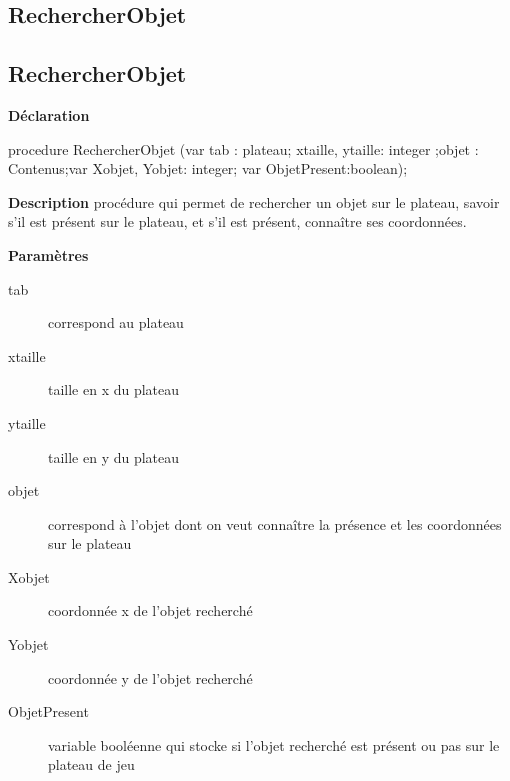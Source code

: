 \documentclass{report}
\newif\ifpdf
\begin{document}
\subsection*{\large{\textbf{RechercherObjet}}\normalsize\hspace{1ex}\hrulefill}
\else
\subsection*{RechercherObjet}
\fi
\label{Generation-RechercherObjet}
\begin{list}{}{
\setlength{\itemindent}{0cm}
\setlength{\listparindent}{0cm}
\setlength{\leftmargin}{\evensidemargin}
\addtolength{\leftmargin}{\tmplength}
\settowidth{\labelsep}{X}
\addtolength{\leftmargin}{\labelsep}
\setlength{\labelwidth}{\tmplength}
}
\item[\textbf{Déclaration}\hfill]
\ifpdf
\begin{flushleft}
\fi
\begin{ttfamily}
procedure RechercherObjet (var tab : plateau; xtaille, ytaille: integer ;objet : Contenus;var Xobjet, Yobjet: integer; var ObjetPresent:boolean);\end{ttfamily}

\ifpdf
\end{flushleft}
\fi

\par
\item[\textbf{Description}]
procédure qui permet de rechercher un objet sur le plateau, savoir s'il est présent sur le plateau, et s'il est présent, connaître ses coordonnées.       \par
\item[\textbf{Paramètres}]
\begin{description}
\item[tab] correspond au plateau
\item[xtaille] taille en x du plateau
\item[ytaille] taille en y du plateau
\item[objet] correspond à l'objet dont on veut connaître la présence et les coordonnées sur le plateau
\item[Xobjet] coordonnée x de l'objet recherché
\item[Yobjet] coordonnée y de l'objet recherché
\item[ObjetPresent] variable booléenne qui stocke si l'objet recherché est présent ou pas sur le plateau de jeu
\end{description}


\end{list}
\ifpdf
\end{document}
